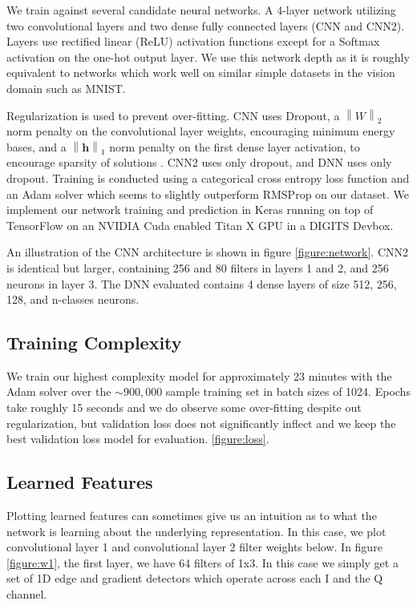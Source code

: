 \documentclass[runningheads,a4paper]{llncs}
\begin{document}
We train against several candidate neural networks.  A 4-layer network utilizing two convolutional layers and two dense fully connected layers (CNN and CNN2).  Layers use rectified linear (ReLU) activation functions except for a Softmax activation on the one-hot output layer.  We use this network depth as it is roughly equivalent to networks which work well on similar simple datasets in the vision domain such as MNIST.

Regularization is used to prevent over-fitting. CNN uses Dropout, a $ \left \| W \right \|_2 $ norm penalty on the convolutional layer weights, encouraging minimum energy bases, and a $ \left \| \mathbf{h} \right \|_1 $ norm penalty on the first dense layer activation, to encourage sparsity of solutions \cite{l1l2reg} \cite{deconv}.  CNN2 uses only dropout, and DNN uses only dropout.
Training is conducted using a categorical cross entropy loss function and an Adam \cite{adam} solver which seems to slightly outperform RMSProp \cite{rmsprop} on our dataset.  We implement our network training and prediction in Keras \cite{keras} running on top of TensorFlow \cite{tensorflow} on an NVIDIA Cuda \cite{cuda} enabled Titan X GPU in a DIGITS Devbox.

An illustration of the CNN architecture is shown in figure \ref{figure:network}.  CNN2 is identical but larger, containing 256 and 80 filters in layers 1 and 2, and 256 neurons in layer 3.  The DNN evaluated contains 4 dense layers of size 512, 256, 128, and n-classes neurons.

\subsection{Training Complexity}

We train our highest complexity model for approximately 23 minutes with the Adam solver over the $\sim 900,000$ sample training set in batch sizes of 1024.  Epochs take roughly 15 seconds and we do observe some over-fitting despite out regularization, but validation loss does not significantly inflect and we keep the best validation loss model for evaluation.  
\ref{figure:loss}.   

\subsection{Learned Features}

Plotting learned features can sometimes give us an intuition as to what the network is learning about the underlying representation.  In this case, we plot convolutional layer 1 and convolutional layer 2 filter weights below.   In figure \ref{figure:w1}, the first layer, we have 64 filters of 1x3.  In this case we simply get a set of 1D edge and gradient detectors which operate across each I and the Q channel.
\end{document}
